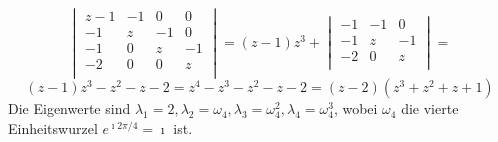 \begin{flushenum}
\begin{itemize}
\[\begin{vmatrix}
					z-1 & -1 & 0 & 0 \\
					-1 & z & -1 & 0 \\
					-1 & 0 & z & -1 \\
					-2 & 0 & 0 & z \\
				\end{vmatrix} = 
				(z-1) z^3 + 
					\begin{vmatrix}
						-1 & -1 & 0 \\
						-1 & z & -1 \\
						-2 & 0 & z \\
					\end{vmatrix} = \] \[
				(z-1)z^3 - z^2 - z  - 2 =
				z^4 - z^3 - z^2 - z - 2 =
				(z-2)(z^3 + z^2 + z + 1) \]
			Die Eigenwerte sind $\lambda_1 = 2, \lambda_2 = \omega_4, \lambda_3 = \omega_4^2, \lambda_4 = \omega_4^3$,
			wobei $\omega_4$ die vierte Einheitswurzel $e^{\imath 2 \pi / 4} = \imath$ ist.
	\end{itemize}


\end{flushenum}
